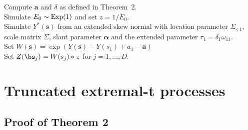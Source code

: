 \documentclass[12pt]{article}
\begin{document}
\begin{algorithm}
\caption{Exact simulation from the skewed Brown-Resnick process at location $\bs_i,i=1,\dots,D$.}
\label{algo:log_skew_normal}
Compute $\bm a$ and $\delta$ as defined in Theorem~2.\\
Simulate $E_0 \sim \rm{Exp}(1)$ and set $z=1/E_0$.\\ 
Simulate $Y^*(\bm s)$ from an extended skew normal with location parameter $\Sigma_{\cdot;1}$, scale matrix $\Sigma$, slant parameter $\bm \alpha$ and the extended parameter $\tau_1=\delta_1 \omega_{11}$.\\
Set $W(\bm s) = \exp(Y(\bm s)-Y(s_1)+a_1 - \bm a)$ \\
Set $Z(\bs_j)=W(s_j)*z$ for $j=1,\dots,D$. \\
\end{algorithm}



\section{Truncated extremal-t processes}
\label{sec:appendix_truncated_extremal_t}

\subsection{Proof of Theorem 2}
\end{document}
